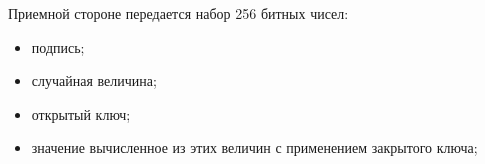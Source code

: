 \begin{frame}
    Приемной стороне передается набор 256 битных чисел: 
      \begin{itemize}[label=---]  
        \item подпись;
        \item случайная величина;
        \item открытый ключ; 
        \item значение вычисленное из этих величин с применением закрытого ключа;
      \end{itemize}
  \end{frame}